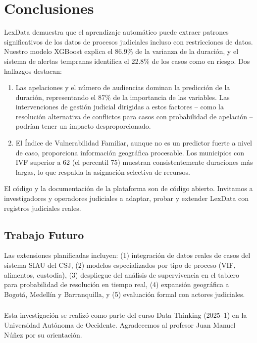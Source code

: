 \documentclass[runningheads]{llncs}
\begin{document}
\section{Conclusiones}

LexData demuestra que el aprendizaje autom\'{a}tico puede extraer patrones significativos de los datos de procesos judiciales incluso con restricciones de datos. Nuestro modelo XGBoost explica el 86.9\% de la varianza de la duraci\'{o}n, y el sistema de alertas tempranas identifica el 22.8\% de los casos como en riesgo. Dos hallazgos destacan:

\begin{enumerate}
    \item Las apelaciones y el n\'{u}mero de audiencias dominan la predicci\'{o}n de la duraci\'{o}n, representando el 87\% de la importancia de las variables. Las intervenciones de gesti\'{o}n judicial dirigidas a estos factores -- como la resoluci\'{o}n alternativa de conflictos para casos con probabilidad de apelaci\'{o}n -- podr\'{i}an tener un impacto desproporcionado.
    \item El \'Indice de Vulnerabilidad Familiar, aunque no es un predictor fuerte a nivel de caso, proporciona informaci\'{o}n geogr\'{a}fica procesable. Los municipios con IVF superior a 62 (el percentil 75) muestran consistentemente duraciones m\'{a}s largas, lo que respalda la asignaci\'{o}n selectiva de recursos.
\end{enumerate}

El c\'{o}digo y la documentaci\'{o}n de la plataforma son de c\'{o}digo abierto. Invitamos a investigadores y operadores judiciales a adaptar, probar y extender LexData con registros judiciales reales.

\subsection*{Trabajo Futuro}

Las extensiones planificadas incluyen: (1) integraci\'{o}n de datos reales de casos del sistema SIAU del CSJ, (2) modelos especializados por tipo de proceso (VIF, alimentos, custodia), (3) despliegue del an\'{a}lisis de supervivencia en el tablero para probabilidad de resoluci\'{o}n en tiempo real, (4) expansi\'{o}n geogr\'{a}fica a Bogot\'{a}, Medell\'{i}n y Barranquilla, y (5) evaluaci\'{o}n formal con actores judiciales.

\begin{credits}
\subsubsection{\ackname} Esta investigaci\'{o}n se realiz\'{o} como parte del curso Data Thinking (2025--1) en la Universidad Aut\'{o}noma de Occidente. Agradecemos al profesor Juan Manuel N\'{u}\~{n}ez por su orientaci\'{o}n.
\end{credits}



\end{document}
